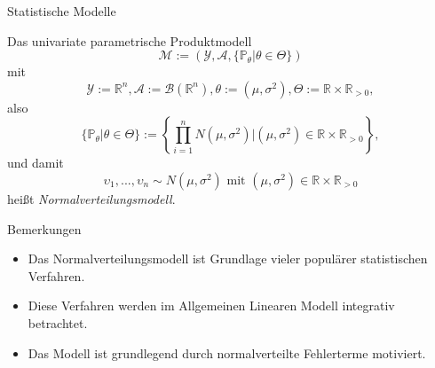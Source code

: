 \documentclass[
  8pt,
  ignorenonframetext,
]{beamer}
\providecommand{\tightlist}{%
  \setlength{\itemsep}{0pt}\setlength{\parskip}{0pt}}
\newcommand{\ups}{\upsilon}
\begin{document}
\begin{frame}{Statistische Modelle}
\protect\hypertarget{statistische-modelle-2}{}
\footnotesize
\begin{definition}[Normalverteilungsmodell]
Das univariate parametrische Produktmodell
\begin{equation}
\mathcal{M} := \left(\mathcal{Y}, \mathcal{A}, \{\mathbb{P}_\theta|\theta \in \Theta\}\right)
\end{equation}
mit
\begin{equation}
\mathcal{Y} := \mathbb{R}^n, \mathcal{A} := \mathcal{B}(\mathbb{R}^n), \theta := (\mu, \sigma^2), \Theta := \mathbb{R} \times \mathbb{R}_{>0},
\end{equation}
also
\begin{equation}
\{\mathbb{P}_\theta|\theta \in \Theta\}
:= \left\lbrace \prod_{i=1}^n N(\mu,\sigma^2)|(\mu,\sigma^2)\in \mathbb{R} \times \mathbb{R}_{>0} \right\rbrace,
\end{equation}
und damit
\begin{equation}
\ups_1,...,\ups_n \sim N(\mu,\sigma^2) \mbox{ mit } (\mu,\sigma^2)\in \mathbb{R} \times \mathbb{R}_{>0}
\end{equation}
heißt \textit{Normalverteilungsmodell}.
\end{definition}
\footnotesize

Bemerkungen

\begin{itemize}
\tightlist
\item
  \justifying Das Normalverteilungsmodell ist Grundlage vieler populärer
  statistischen Verfahren.
\item
  Diese Verfahren werden im Allgemeinen Linearen Modell integrativ
  betrachtet.
\item
  Das Modell ist grundlegend durch normalverteilte Fehlerterme
  motiviert.
\end{itemize}
\end{frame}
\end{document}
